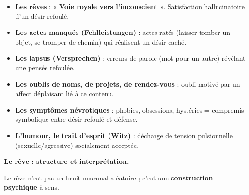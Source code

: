 \documentclass[11pt]{article}
\begin{document}
\begin{propriete}
\begin{itemize}
    \item \textbf{Les rêves} : « \textbf{Voie royale vers l'inconscient} ». Satisfaction hallucinatoire d'un désir refoulé.
    \item \textbf{Les actes manqués (Fehlleistungen)} : actes ratés (laisser tomber un objet, se tromper de chemin) qui réalisent un désir caché.
    \item \textbf{Les lapsus (Versprechen)} : erreurs de parole (mot pour un autre) révélant une pensée refoulée.
    \item \textbf{Les oublis de noms, de projets, de rendez-vous} : oubli motivé par un affect déplaisant lié à ce contenu.
    \item \textbf{Les symptômes névrotiques} : phobies, obsessions, hystéries = compromis symbolique entre désir refoulé et défense.
    \item \textbf{L'humour, le trait d'esprit (Witz)} : décharge de tension pulsionnelle (sexuelle/agressive) socialement acceptée.
\end{itemize}
\end{propriete}

\textbf{Le rêve : structure et interprétation.}\par
Le rêve n'est pas un bruit neuronal aléatoire ; c'est une \textbf{construction psychique} à sens.
\end{document}
